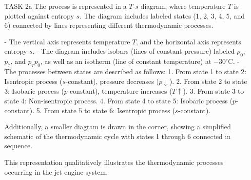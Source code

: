 TASK 2a  
The process is represented in a \( T \)-\( s \) diagram, where temperature \( T \) is plotted against entropy \( s \). The diagram includes labeled states (1, 2, 3, 4, 5, and 6) connected by lines representing different thermodynamic processes.  

- The vertical axis represents temperature \( T \), and the horizontal axis represents entropy \( s \).  
- The diagram includes isobars (lines of constant pressure) labeled \( p_0 \), \( p_7 \), and \( p_7p_0 \), as well as an isotherm (line of constant temperature) at \( -30^\circ\text{C} \).  
- The processes between states are described as follows:  
  1. From state 1 to state 2: Isentropic process (\( s \)-constant), pressure decreases (\( p \downarrow \)).  
  2. From state 2 to state 3: Isobaric process (\( p \)-constant), temperature increases (\( T \uparrow \)).  
  3. From state 3 to state 4: Non-isentropic process.  
  4. From state 4 to state 5: Isobaric process (\( p \)-constant).  
  5. From state 5 to state 6: Isentropic process (\( s \)-constant).  

Additionally, a smaller diagram is drawn in the corner, showing a simplified schematic of the thermodynamic cycle with states 1 through 6 connected in sequence.  

This representation qualitatively illustrates the thermodynamic processes occurring in the jet engine system.
